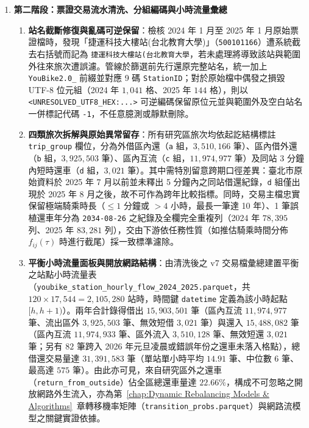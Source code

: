 \begin{enumerate}
    \item \textbf{第二階段：票證交易流水清洗、分組編碼與小時流量彙總}
    \begin{enumerate}[label = \textbullet]
        \item \textbf{站名截斷修復與亂碼可逆保留}：檢核 2024 年 1 月至 2025 年 1 月原始票證檔時，發現「捷運科技大樓站(台北教育大學)」（\texttt{500101166}）遭系統截去右括號而記為 \texttt{捷運科技大樓站(台北教育大學}，若未處理將導致該站與範圍外往來旅次遭誤濾。管線於篩選前先行還原完整站名，統一加上 \texttt{YouBike2.0\_} 前綴並對應 9 碼 \texttt{StationID}；對於原始檔中偶發之損毀 UTF-8 位元組（2024 年 $1{,}041$ 格、2025 年 $144$ 格），則以 \texttt{<UNRESOLVED\_UTF8\_HEX:...>} 可逆編碼保留原位元並與範圍外及空白站名一併標記代碼 \texttt{-1}，不任意臆測或靜默刪除。
        \item \textbf{四類旅次拆解與原始異常留存}：所有研究區旅次均依起訖結構標註 \texttt{trip\_group} 欄位，分為外借區內還（\texttt{a} 組，$3{,}510{,}166$ 筆）、區內借外還（\texttt{b} 組，$3{,}925{,}503$ 筆）、區內互流（\texttt{c} 組，$11{,}974{,}977$ 筆）及同站 3 分鐘內短時還車（\texttt{d} 組，$3{,}021$ 筆）。其中需特別留意跨期口徑差異：臺北市原始資料於 2025 年 7 月以前並未釋出 5 分鐘內之同站借還紀錄，\texttt{d} 組僅出現於 2025 年 8 月之後，故不可作為跨年比較指標。同時，交易主檔忠實保留極端騎乘時長（$\le 1$ 分鐘或 $> 4$ 小時，最長一筆達 10 年）、1 筆誤植還車年分為 \texttt{2034-08-26} 之紀錄及全欄完全重複列（2024 年 $78{,}395$ 列、2025 年 $83{,}281$ 列），交由下游依任務性質（如推估騎乘時間分佈 $f_{ij}(\tau)$ 時進行截尾）採一致標準濾除。
        \item \textbf{平衡小時流量面板與開放網路結構}：由清洗後之 v7 交易檔彙總建置平衡之站點小時流量表（\texttt{youbike\_station\_\allowbreak hourly\_flow\_2024\_2025.parquet}，共 $120 \times 17{,}544 = 2{,}105{,}280$ 站時，時間鍵 \texttt{datetime} 定義為該小時起點 $[h, h+1)$）。兩年合計錄得借出 $15{,}903{,}501$ 筆（區內互流 $11{,}974{,}977$ 筆、流出區外 $3{,}925{,}503$ 筆、無效短借 $3{,}021$ 筆）與還入 $15{,}488{,}082$ 筆（區內互流 $11{,}974{,}933$ 筆、區外流入 $3{,}510{,}128$ 筆、無效短還 $3{,}021$ 筆；另有 $82$ 筆跨入 2026 年元旦凌晨或錯誤年份之還車未落入格點），總借還交易量達 $31{,}391{,}583$ 筆（單站單小時平均 $14.91$ 筆、中位數 $6$ 筆、最高達 $575$ 筆）。由此亦可見，來自研究區外之還車（\texttt{return\_from\_outside}）佔全區總還車量達 $22.66\%$，構成不可忽略之開放網路外生流入，亦為第~\ref{chap:Dynamic Rebalancing Models & Algorithms}~章轉移機率矩陣（\texttt{transition\_probs.parquet}）與網路流模型之關鍵實證依據。
    \end{enumerate}


\end{enumerate}
